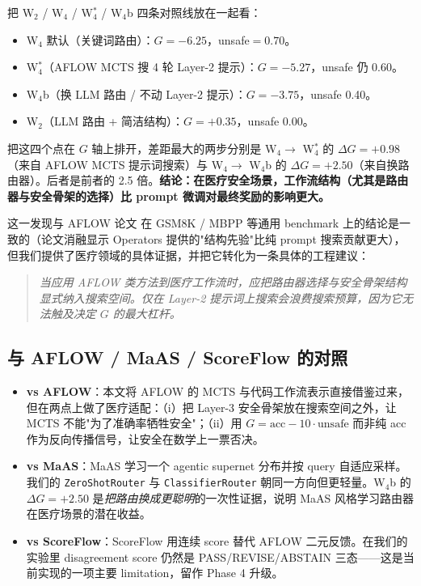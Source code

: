 \documentclass[11pt,a4paper]{ctexart}
\newcommand{\acc}{\mathrm{acc}}
\newcommand{\unsafe}{\mathrm{unsafe}}
\begin{document}
把 W$_2$ / W$_4$ / W$_4^*$ / W$_4$b 四条对照线放在一起看：

\begin{itemize}
    \item W$_4$ 默认（关键词路由）：$G=-6.25$，unsafe$=0.70$。
    \item W$_4^*$（AFLOW MCTS 搜 4 轮 Layer-2 提示）：$G=-5.27$，unsafe 仍 0.60。
    \item W$_4$b（换 LLM 路由 / 不动 Layer-2 提示）：$G=-3.75$，unsafe 0.40。
    \item W$_2$（LLM 路由 + 简洁结构）：$G=+0.35$，unsafe 0.00。
\end{itemize}

把这四个点在 $G$ 轴上排开，差距最大的两步分别是 W$_4 \to$ W$_4^*$ 的 $\Delta G=+0.98$（来自 AFLOW MCTS 提示词搜索）与 W$_4 \to$ W$_4$b 的 $\Delta G=+2.50$（来自换路由器）。后者是前者的 2.5 倍。\textbf{结论：在医疗安全场景，工作流结构（尤其是路由器与安全骨架的选择）比 prompt 微调对最终奖励的影响更大。}

这一发现与 AFLOW 论文 \cite{aflow2024} 在 GSM8K / MBPP 等通用 benchmark 上的结论是一致的（论文消融显示 Operators 提供的"结构先验"比纯 prompt 搜索贡献更大），但我们提供了医疗领域的具体证据，并把它转化为一条具体的工程建议：

\begin{quote}
\itshape
当应用 AFLOW 类方法到医疗工作流时，应把路由器选择与安全骨架结构\emph{显式纳入}搜索空间。仅在 Layer-2 提示词上搜索会浪费搜索预算，因为它无法触及决定 $G$ 的最大杠杆。
\end{quote}

\subsection{与 AFLOW / MaAS / ScoreFlow 的对照}

\begin{itemize}
    \item \textbf{vs AFLOW}：本文将 AFLOW 的 MCTS 与代码工作流表示直接借鉴过来，但在两点上做了医疗适配：（i）把 Layer-3 安全骨架放在搜索空间之外，让 MCTS 不能"为了准确率牺牲安全"；（ii）用 $G = \acc - 10 \cdot \unsafe$ 而非纯 acc 作为反向传播信号，让安全在数学上一票否决。
    \item \textbf{vs MaAS}：MaAS \cite{maas2025} 学习一个 agentic supernet 分布并按 query 自适应采样。我们的 \texttt{ZeroShotRouter} 与 \texttt{ClassifierRouter} 朝同一方向但更轻量。W$_4$b 的 $\Delta G=+2.50$ 是\emph{把路由换成更聪明}的一次性证据，说明 MaAS 风格学习路由器在医疗场景的潜在收益。
    \item \textbf{vs ScoreFlow}：ScoreFlow \cite{scoreflow2025} 用连续 score 替代 AFLOW 二元反馈。在我们的实验里 disagreement score 仍然是 PASS/REVISE/ABSTAIN 三态——这是当前实现的一项主要 limitation，留作 Phase 4 升级。
\end{itemize}
\end{document}
